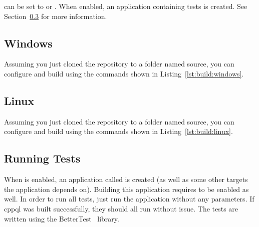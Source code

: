  can be set to  or . When enabled, an application containing tests is created. See Section~\ref{section:build:tests} for more information.

\subsection{Windows}
\label{section:build:windows}

Assuming you just cloned the repository to a folder named source, you can configure and build using the commands shown in Listing~\ref{lst:build:windows}.



\subsection{Linux}
\label{section:build:linux}

Assuming you just cloned the repository to a folder named source, you can configure and build using the commands shown in Listing~\ref{lst:build:linux}.



\subsection{Running Tests}
\label{section:build:tests}

When  is enabled, an application called  is created (as well as some other targets the application depends on). Building this application requires  to be enabled as well. In order to run all tests, just run the application without any parameters. If \gls{cppql} was built successfully, they should all run without issue. The tests are written using the BetterTest~\cite{bettertest} library.
